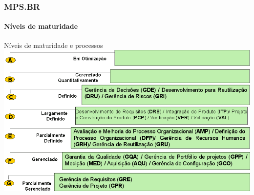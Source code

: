 \begin{frame}
	\frametitle{MPS.BR}
	\framesubtitle{Níveis de maturidade}
	
	\begin{block:fact}{Níveis de maturidade e processos}
		\centering
		\includegraphics[width=\textwidth]{software-engineering/project-management/process/process-quality/mpsbr/levels-processes}
	\end{block:fact}
\end{frame}


